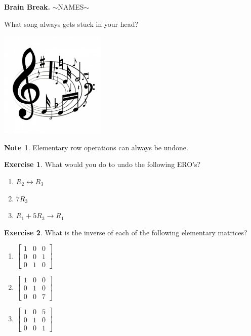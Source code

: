 \documentclass[handout]{beamer}
\newcommand{\fn}{\insertframenumber}
\theoremstyle{definition}
\newtheorem{exercise}{Exercise}
\newtheorem*{nb}{Note}
\begin{document}
\begin{frame}{\fn}
	\begin{block}{\textbf{Brain Break.}}
		$\sim$NAMES$\sim$
		
		What song always gets stuck in your head?
		
		\begin{center}
			\includegraphics[width=2in]{../images/song}
		\end{center}
	\end{block}
\end{frame}
\begin{frame}{\fn}
	\begin{nb}
		Elementary row operations can always be undone.
	\end{nb}
	\begin{exercise}
		What would you do to undo the following ERO's?
		\begin{multicols}{3}\begin{enumerate}[label=(\alph*)]
			\item $R_2\leftrightarrow R_3$
			\item $7R_3$
			\item $R_1+5R_3\rightarrow R_1$
		\end{enumerate}
		\end{multicols}
	\end{exercise}
\begin{exercise}
	What is the inverse of each of the following elementary matrices?
	\begin{multicols}{3}
		\begin{enumerate}[label=(\alph*)]
		\item $\begin{bmatrix}1&0&0\\0&0&1\\0&1&0\end{bmatrix}$
		\item $\begin{bmatrix}1&0&0\\0&1&0\\0&0&7\end{bmatrix}$
		\item $\begin{bmatrix}1&0&5\\0&1&0\\0&0&1\end{bmatrix}$
	\end{enumerate}
\end{multicols}
	\end{exercise}
\end{frame}
\end{document}

